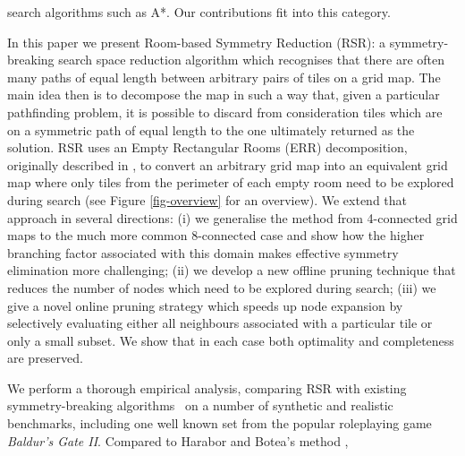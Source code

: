 search algorithms such as A*.
Our contributions fit into this category.
%
\par
In this paper we present Room-based Symmetry Reduction (RSR): a
symmetry-breaking search space reduction algorithm which recognises 
that there are often many paths of equal length between arbitrary pairs of tiles on a 
grid map.
The main idea then is to decompose the map in such a way that, 
given a particular pathfinding problem, it is possible to discard from consideration tiles which are on 
a symmetric path of equal length to the one ultimately returned as the solution.
RSR uses an Empty Rectangular Rooms (ERR) decomposition, originally described in
\cite{harabor10}, to convert an arbitrary grid map into an equivalent grid map where only tiles from the 
perimeter of each empty room need to be explored during search (see Figure
\ref{fig-overview} for an overview).
We extend that approach in several directions: (i) we generalise the method from 4-connected grid maps to 
the much more common 8-connected case and show how the higher branching factor associated 
with this domain makes effective symmetry elimination more challenging;
(ii) we develop a new offline pruning technique that reduces the number of nodes which
need to be explored during search;
(iii) we give a novel online pruning strategy which speeds up node expansion by selectively 
evaluating either all neighbours associated with a particular tile or only a small subset.
We show that in each case both optimality and completeness are preserved.
\par
We perform a thorough empirical analysis, comparing RSR with existing
symmetry-breaking algorithms~\cite{pochter10,harabor10}
on a number of synthetic and realistic benchmarks, including one well known set 
from the popular roleplaying game \emph{Baldur's Gate II}.
Compared to Harabor and Botea's method , 
